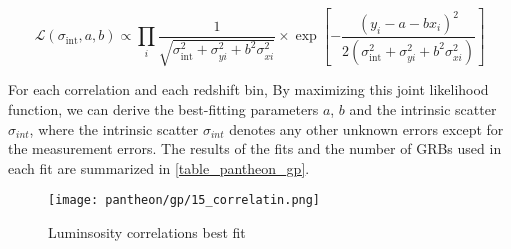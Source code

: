 $$
\mathcal{L}\left(\sigma_{\mathrm{int}}, a, b\right) \propto \prod_{i} \frac{1}{\sqrt{\sigma_{\mathrm{int}}^{2}+\sigma_{y i}^{2}+b^{2} \sigma_{x i}^{2}}} \times \exp \left[-\frac{\left(y_{i}-a-b x_{i}\right)^{2}}{2\left(\sigma_{\mathrm{int}}^{2}+\sigma_{y i}^{2}+b^{2} \sigma_{x i}^{2}\right)}\right]
$$


For each correlation and each redshift bin, By maximizing this joint likelihood function, we can derive the best-fitting parameters $a$, $b$ and the intrinsic scatter $\sigma_{int}$, where the intrinsic scatter $\sigma_{int}$ denotes any other unknown errors except for the measurement errors. The results of the fits and the number of GRBs used in each fit are summarized in \eqref{table_pantheon_gp}.


\begin{figure}[h]
	\centering
	\texttt{[image: pantheon/gp/15\_correlatin.png]}
	\caption{Luminsosity correlations best fit}
	\label{fig:correlation_gp}
\end{figure}


